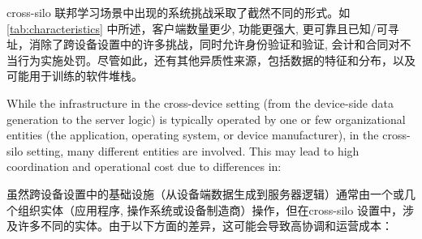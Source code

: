 cross-silo 联邦学习场景中出现的系统挑战采取了截然不同的形式。如 \cref{tab:characteristics} 中所述，客户端数量更少, 功能更强大, 更可靠且已知/可寻址，消除了跨设备设置中的许多挑战，同时允许身份验证和验证, 会计和合同对不当行为实施处罚。尽管如此，还有其他异质性来源，包括数据的特征和分布，以及可能用于训练的软件堆栈。

While the infrastructure in the cross-device setting (from the device-side data generation to the server logic) is typically operated by one or few organizational entities (the application, operating system, or device manufacturer), in the cross-silo setting, many different entities are involved. This may lead to high coordination and operational cost due to differences in:

虽然跨设备设置中的基础设施（从设备端数据生成到服务器逻辑）通常由一个或几个组织实体（应用程序, 操作系统或设备制造商）操作，但在cross-silo 设置中，涉及许多不同的实体。由于以下方面的差异，这可能会导致高协调和运营成本：



